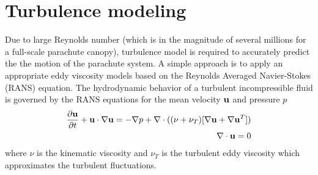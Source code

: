 \section{Turbulence modeling} \label{sec:turbulence}
Due to large Reynolds number (which is in the magnitude of several millions for a full-scale parachute canopy\cite{Johari2005}), turbulence model is required to accurately predict the the motion of the parachute system. A simple approach is to apply an appropriate eddy viscosity models based on the Reynolds Averaged Navier-Stokes (RANS) equation. The
hydrodynamic behavior of a turbulent incompressible fluid is governed by the
RANS equations for the mean velocity $\mathbf{u}$ and pressure $p$ 
\begin{equation}
\begin{aligned} 
\frac{\partial \mathbf{u}}{\partial t}+\mathbf{u}\cdot\nabla \mathbf{u} = -\nabla p +
\nabla\cdot((\nu+\nu_T)[\nabla \mathbf{u} + \nabla \mathbf{u}^T])\\ 
\nabla\cdot \mathbf{u} = 0
\end{aligned}\label{eq:NS} \end{equation} 
where $\nu$ is the kinematic viscosity and $\nu_T$ is the turbulent eddy viscosity which approximates the turbulent fluctuations.


